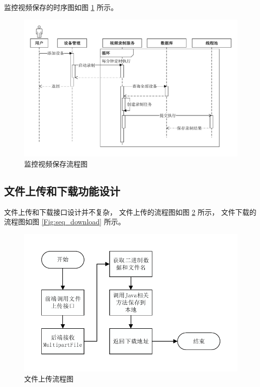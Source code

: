监控视频保存的时序图如图 \ref{Fig:video_save} 所示。

\begin{figure}[ht]
    \centering
    \includegraphics[width=1\linewidth]{./Figure/IMG_video_save.pdf}
    \caption{监控视频保存流程图}\label{Fig:video_save}
\end{figure}

\subsection{文件上传和下载功能设计}

文件上传和下载接口设计并不复杂，
文件上传的流程图如图 \ref{Fig:seq_upload} 所示，
文件下载的流程图如图 \ref{Fig:seq_download} 所示。

\begin{figure}[ht]
    \centering
    \includegraphics[width=.7\linewidth]{./Figure/IMG_seq_upload.pdf}
    \caption{文件上传流程图}\label{Fig:seq_upload}
\end{figure}

